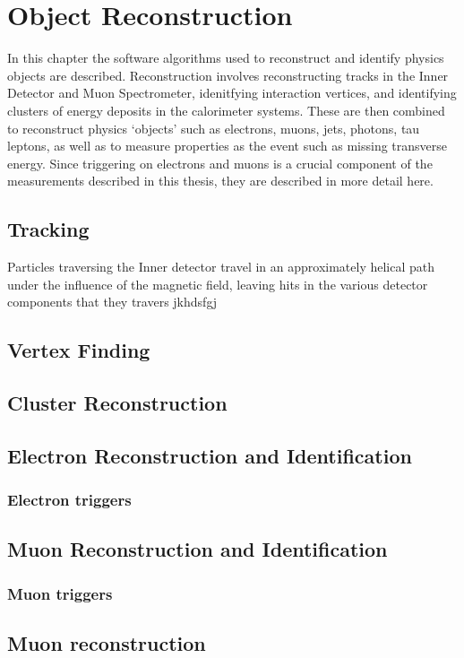 \graphicspath{{Chapters/Reconstruction/Figures/}}
\chapter{Object Reconstruction}

In this chapter the software algorithms used to reconstruct and identify physics
objects are described. Reconstruction involves reconstructing tracks in the
Inner Detector and Muon Spectrometer, idenitfying interaction vertices,
and identifying clusters of energy deposits in the calorimeter systems. These are
then combined to reconstruct physics `objects' such as electrons, muons, jets, photons,
tau leptons, as well as to measure properties as the event such as missing
transverse energy. 
Since triggering on electrons and muons is a crucial component of the
measurements described in this thesis, they are described in more detail here.

\label{chap:Reconstruction}

\section{Tracking}

Particles traversing the Inner detector travel in an approximately helical path
under the influence of the magnetic field, leaving hits in the various detector components that they travers
jkhdsfgj
\label{sec:reco-tracking}
\section{Vertex Finding}
\label{sec:reco-vertexing}
\section{Cluster Reconstruction}
\label{sec:reco-clustering}
\section{Electron Reconstruction and Identification}
\label{sec:reco-el}
\subsection{Electron triggers}
\label{sec:reco-triggers}
\section{Muon Reconstruction and Identification}
\label{sec:reco-mu}
\subsection{Muon triggers}
\label{sec:reco-triggers}
\section{Muon reconstruction}

